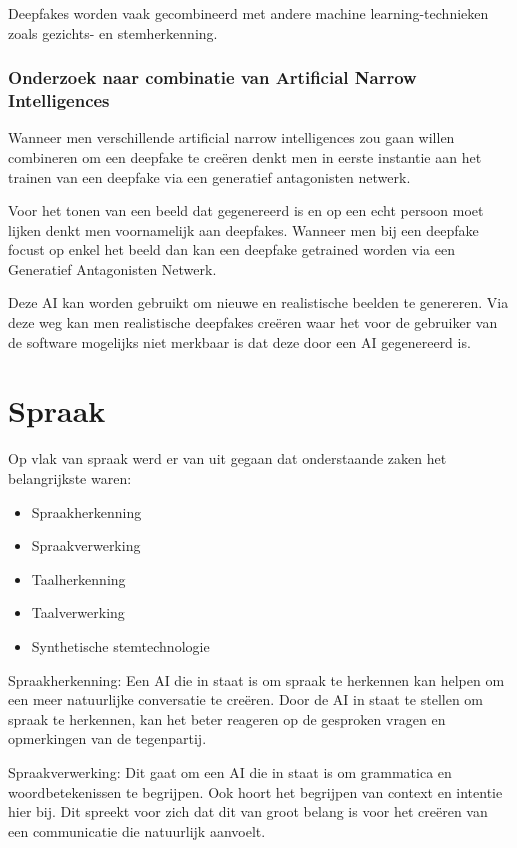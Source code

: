 Deepfakes worden vaak gecombineerd met andere machine learning-technieken zoals gezichts- en stemherkenning.

\subsubsection{Onderzoek naar combinatie van Artificial Narrow Intelligences}

Wanneer men verschillende artificial narrow intelligences zou gaan willen combineren om een deepfake te creëren denkt men in eerste instantie aan het trainen van een deepfake via een generatief antagonisten netwerk.

Voor het tonen van een beeld dat gegenereerd is en op een echt persoon moet lijken denkt men voornamelijk aan deepfakes. Wanneer men bij een deepfake focust op enkel het beeld dan kan een deepfake getrained worden via een Generatief Antagonisten Netwerk.

Deze AI kan worden gebruikt om nieuwe en realistische beelden te genereren. Via deze weg kan men realistische deepfakes creëren waar het voor de gebruiker van de software mogelijks niet merkbaar is dat deze door een AI gegenereerd is.

\section{Spraak}

Op vlak van spraak werd er van uit gegaan dat onderstaande zaken het belangrijkste waren:

\begin{itemize}
    \item Spraakherkenning
    \item Spraakverwerking
    \item Taalherkenning
    \item Taalverwerking
    \item Synthetische stemtechnologie
\end{itemize}

Spraakherkenning: Een AI die in staat is om spraak te herkennen kan helpen om een meer natuurlijke conversatie te creëren. Door de AI in staat te stellen om spraak te herkennen, kan het beter reageren op de gesproken vragen en opmerkingen van de tegenpartij.

Spraakverwerking: Dit gaat om een AI die in staat is om grammatica en woordbetekenissen te begrijpen. Ook hoort het begrijpen van context en intentie hier bij. Dit spreekt voor zich dat dit van groot belang is voor het creëren van een communicatie die natuurlijk aanvoelt.

